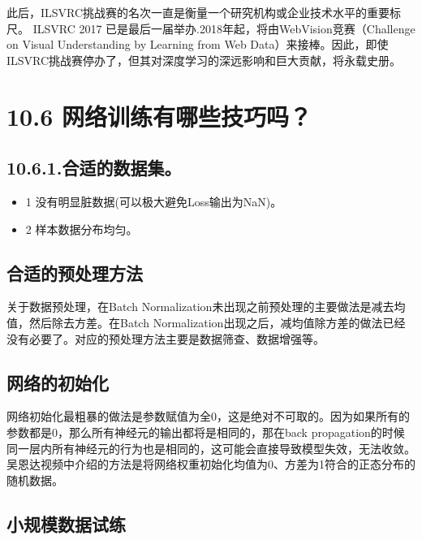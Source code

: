 此后，ILSVRC挑战赛的名次一直是衡量一个研究机构或企业技术水平的重要标尺。
ILSVRC 2017 已是最后一届举办.2018年起，将由WebVision竞赛（Challenge on
Visual Understanding by Learning from Web
Data）来接棒。因此，即使ILSVRC挑战赛停办了，但其对深度学习的深远影响和巨大贡献，将永载史册。

\section{10.6
网络训练有哪些技巧吗？}\label{ux7f51ux7edcux8badux7ec3ux6709ux54eaux4e9bux6280ux5de7ux5417}

\subsection{10.6.1.合适的数据集。}\label{ux5408ux9002ux7684ux6570ux636eux96c6}

\begin{itemize}
\item
  1 没有明显脏数据(可以极大避免Loss输出为NaN)。
\item
  2 样本数据分布均匀。
\end{itemize}

\subsection{合适的预处理方法}\label{ux5408ux9002ux7684ux9884ux5904ux7406ux65b9ux6cd5}

关于数据预处理，在Batch
Normalization未出现之前预处理的主要做法是减去均值，然后除去方差。在Batch
Normalization出现之后，减均值除方差的做法已经没有必要了。对应的预处理方法主要是数据筛查、数据增强等。

\subsection{网络的初始化}\label{ux7f51ux7edcux7684ux521dux59cbux5316}

网络初始化最粗暴的做法是参数赋值为全0，这是绝对不可取的。因为如果所有的参数都是0，那么所有神经元的输出都将是相同的，那在back
propagation的时候同一层内所有神经元的行为也是相同的，这可能会直接导致模型失效，无法收敛。吴恩达视频中介绍的方法是将网络权重初始化均值为0、方差为1符合的正态分布的随机数据。

\subsection{小规模数据试练}\label{ux5c0fux89c4ux6a21ux6570ux636eux8bd5ux7ec3}

